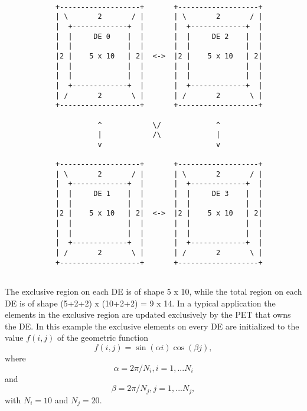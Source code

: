    \begin{verbatim}
   
            +-------------------+       +-------------------+
            | \       2       / |       | \       2       / |
            |  +-------------+  |       |  +-------------+  |
            |  |     DE 0    |  |       |  |     DE 2    |  |
            |  |             |  |       |  |             |  |
            |2 |    5 x 10   | 2|  <->  |2 |    5 x 10   | 2|
            |  |             |  |       |  |             |  |
            |  |             |  |       |  |             |  |
            |  +-------------+  |       |  +-------------+  |
            | /       2       \ |       | /       2       \ |
            +-------------------+       +-------------------+
  
                      ^            \/             ^
                      |            /\             |
                      v                           v
  
            +-------------------+       +-------------------+
            | \       2       / |       | \       2       / |
            |  +-------------+  |       |  +-------------+  |
            |  |     DE 1    |  |       |  |     DE 3    |  |
            |  |             |  |       |  |             |  |
            |2 |    5 x 10   | 2|  <->  |2 |    5 x 10   | 2|
            |  |             |  |       |  |             |  |
            |  |             |  |       |  |             |  |
            |  +-------------+  |       |  +-------------+  |
            | /       2       \ |       | /       2       \ |
            +-------------------+       +-------------------+
  
   \end{verbatim}
  
   The exclusive region on each DE is of shape 5 x 10, while the total region
   on each DE is of shape (5+2+2) x (10+2+2) = 9 x 14. In a typical application
   the elements in the exclusive region are updated exclusively by the PET that
   owns the DE. In this example the exclusive elements on every DE are
   initialized to the value $f(i,j)$ of the geometric function
   \begin{equation}
   f(i,j) = \sin(\alpha i)\cos(\beta j),
   \end{equation}
   where
   \begin{equation}
   \alpha = 2\pi/N_i, i=1,...N_i
   \end{equation}
   and
   \begin{equation}
   \beta = 2\pi/N_j, j=1,...N_j,
   \end{equation}
   with $N_i = 10$ and $N_j = 20$. 

